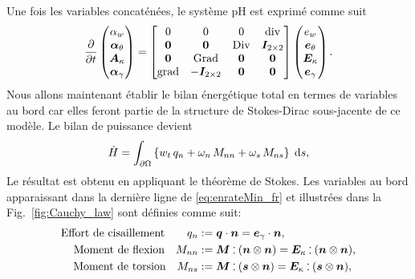 Une fois les variables concaténées, le système pH est exprimé comme suit
\begin{equation}
\diffp{}{t}
\begin{pmatrix}
\alpha_w \\
\bm\alpha_\theta \\
\bm{A}_\kappa \\
\bm\alpha_{\gamma} \\
\end{pmatrix} = 
\begin{bmatrix}
0  & 0  & 0  & \div \\
\bm{0} & \bm{0} &  \Div & \bm{I}_{2 \times 2}\\
\bm{0}  & \Grad  & \bm{0}  & \bm{0}\\
\grad & -\bm{I}_{2 \times 2} &  \bm{0} & \bm{0} \\
\end{bmatrix}
\begin{pmatrix}
e_w \\
\bm{e}_{\theta} \\
\bm{E}_{\kappa} \\
\bm{e}_{\gamma} \\
\end{pmatrix}.
\end{equation}
Nous allons maintenant établir le bilan énergétique total en termes de variables au bord car elles feront partie de la structure de Stokes-Dirac sous-jacente de ce modèle. Le bilan de puissance devient
\begin{equation}
\label{eq:enrateMin_fr}
\dot{H}= \int_{\partial \Omega} \left\{ w_t \, q_n  + \omega_n \, M_{nn} + \omega_s \, M_{ns} \right\} \d{s},  
\end{equation}
Le résultat est obtenu en appliquant le théorème de Stokes. Les variables au bord apparaissant dans la dernière ligne de \eqref{eq:enrateMin_fr} et illustrées dans la Fig.~\ref{fig:Cauchy_law} sont définies comme suit:
\begin{equation}
\label{eq:QnMnnMns_fr}
\begin{aligned}
\text{Effort de cisaillement}  \qquad q_{n} &:= \bm{q} \cdot \bm{n}=  \bm{e}_{\gamma} \cdot \bm{n},  \\
\text{Moment de flexion} \quad 
M_{nn} &:=  \bm{M} \cddot (\bm{n}\otimes{\bm{n}}) = \bm{E}_{\kappa} \cddot (\bm{n}\otimes{\bm{n}}), 	\\
\text{Moment de torsion} \quad M_{ns} &:= \bm{M} \cddot (\bm{s}\otimes{\bm{n}}) = \bm{E}_{\kappa} \cddot (\bm{s}\otimes{\bm{n}}),	
\end{aligned}
\end{equation}

